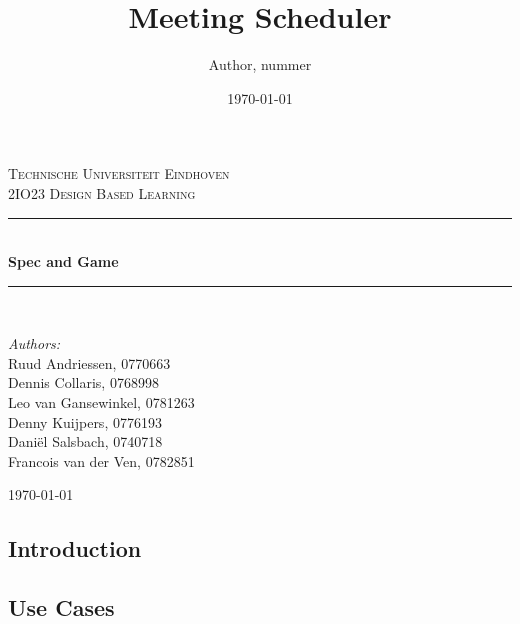 \documentclass[a4paper,twoside,11pt]{article}
\title{\vspace{-\baselineskip}\sffamily\bfseries Meeting Scheduler}
\author{Author, nummer}
\date{\today}
\newcommand{\HRule}{\rule{\linewidth}{0.5mm}}
\begin{document}

\begin{titlepage}

\begin{center}

 

\textsc{\LARGE Technische Universiteit Eindhoven}\\[1.5cm]

\textsc{\Large 2IO23 Design Based Learning}\\[0.5cm]


\HRule \\[0.4cm]
{ \huge \bfseries Spec and Game}\\[0.4cm]
\HRule \\[1.5cm]

\begin{minipage}{0.4\textwidth}
\begin{flushleft} \large
\emph{Authors:}\\
Ruud Andriessen, 0770663\\
Dennis Collaris, 0768998\\
Leo van Gansewinkel, 0781263\\
Denny Kuijpers, 0776193\\
Daniël Salsbach, 0740718\\
Francois van der Ven, 0782851
\end{flushleft}
\end{minipage}
\begin{minipage}{0.4\textwidth}
\begin{flushright} \large

\end{flushright}
\end{minipage}
\vfill
{\large \today}
\end{center}
\end{titlepage}
\tableofcontents
\newpage
\begin{center}
\section{Introduction}
\end{center}
\begin{center}
\section{Use Cases}
\end{center}
\end{document}
